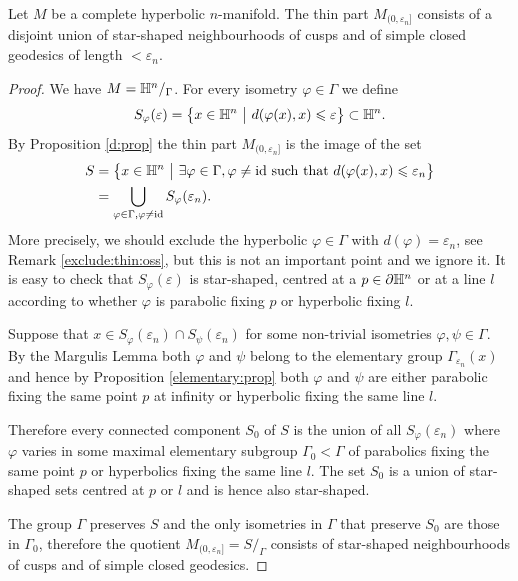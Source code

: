 \begin{teo} Let $M$ be a complete hyperbolic $n$-manifold. The thin part $M_{(0,\varepsilon_n]}$ consists of a disjoint union of star-shaped neighbourhoods of cusps and of simple closed geodesics of length $< \varepsilon_n$.
\end{teo}
\begin{proof}
We have $M=\mathbb{H}^n/_\Gamma$. For every isometry $\varphi\in \Gamma $ we define
$$S_\varphi(\varepsilon) = \big\{ x\in\mathbb{H}^n\ \big|\ d(\varphi(x),x)\leqslant \varepsilon\big\}\subset \mathbb{H}^n.$$
By Proposition \ref{d:prop} the thin part $M_{(0,\varepsilon_n]}$ is the image of the set 
\begin{align*}
 S & = \big\{x\in \mathbb{H}^n\ \big|\ \exists \varphi\in \Gamma, \varphi\neq {\rm id} {\rm\ such\ that\ } d(\varphi(x),x)\leqslant \varepsilon_n\big\} \\
 & = \bigcup_{\varphi\in \Gamma, \varphi \neq {\rm id}} S_\varphi(\varepsilon_n).
 \end{align*}
More precisely, we should exclude the hyperbolic $\varphi \in \Gamma$ with $d(\varphi)=\varepsilon_n$, see Remark \ref{exclude:thin:oss}, but this is not an important point and we ignore it. It is easy to check that $S_\varphi(\varepsilon)$ is star-shaped, centred at a $p\in \partial \mathbb{H}^n$ or at a line $l$ according to whether $\varphi$ is parabolic fixing $p$ or hyperbolic fixing $l$.

Suppose that $x\in S_\varphi(\varepsilon_n) \cap S_\psi(\varepsilon_n)$ for some non-trivial isometries $\varphi, \psi \in \Gamma$. By the Margulis Lemma both $\varphi$ and $\psi$ belong to the elementary group $\Gamma_{\varepsilon_n}(x)$ and hence by Proposition \ref{elementary:prop} both $\varphi$ and $\psi$ are either parabolic fixing the same point $p$ at infinity or hyperbolic fixing the same line $l$.

Therefore every connected component $S_0$ of $S$ is the union of all $S_\varphi(\varepsilon_n)$ where $\varphi$ varies in some maximal elementary subgroup $\Gamma_0<\Gamma$ of parabolics fixing the same point $p$ or hyperbolics fixing the same line $l$. The set $S_0$ is a union of star-shaped sets centred at $p$ or $l$ and is hence also star-shaped. 

The group $\Gamma$ preserves $S$ and the only isometries in $\Gamma$ that preserve $S_0$ are those in $\Gamma_0$, therefore the quotient $M_{(0,\varepsilon_n]} = S/_\Gamma$ consists of star-shaped neighbourhoods of cusps and of simple closed geodesics.
\end{proof}

